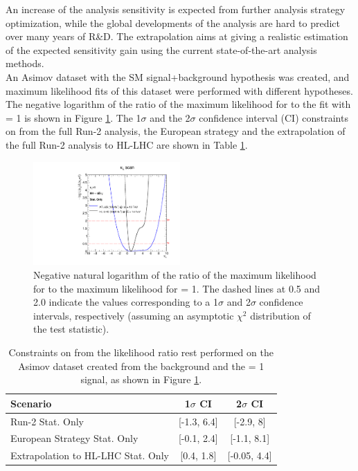 An increase of the analysis sensitivity is expected from further analysis strategy optimization, while the global developments of the analysis are hard to predict over many years of R\&D. The extrapolation aims at giving a realistic estimation of the expected sensitivity gain using the current state-of-the-art analysis methods. \\

An Asimov dataset with the SM signal+background hypothesis was created, and maximum likelihood fits of this dataset were performed with different \kl hypotheses. The negative logarithm of the ratio of the maximum likelihood for \kl to the fit with \kl= 1 is shown in Figure \ref{fig:HL-LHC:LH}. The 1$\sigma$ and the 2$\sigma$ confidence interval (CI) constraints on \kl from the full Run-2 analysis, the European strategy and the extrapolation of the full Run-2 analysis to HL-LHC are shown in Table \ref{tab:HL-LHC:kl}. 

\begin{figure}[htbp]
    \centering
    \includegraphics[width=0.5\textwidth]{Ch6/Img/likelihood_subplot_14TeV.pdf}
    \begin{tcolorbox}[colback=black!5!white, colframe=white!75!black]
    \caption{Negative natural logarithm of the ratio of the maximum likelihood for \kl to the maximum likelihood for \kl= 1. The dashed lines at 0.5 and 2.0 indicate the values corresponding to a 1$\sigma$ and 2$\sigma$ confidence intervals, respectively (assuming an asymptotic $\chi^2$ distribution of the test statistic).}
    \label{fig:HL-LHC:LH}
    \end{tcolorbox}
\end{figure}

\begin{table}[htbp]
    \centering
    \begin{tabular}{lcc}
    \hline\hline 
        Scenario & 1$\sigma$ CI & 2$\sigma$ CI \\
    \hline    
        Run-2 Stat. Only & [-1.3, 6.4]  & [-2.9, 8] \\ 
        European Strategy Stat. Only & [-0.1, 2.4] & [-1.1, 8.1] \\
        Extrapolation to HL-LHC Stat. Only & [0.4, 1.8] & [-0.05, 4.4] \\
    \hline\hline 
    \end{tabular}
    \begin{tcolorbox}[colback=black!5!white, colframe=white!75!black]
    \caption{Constraints on \kl from the likelihood ratio rest performed on the Asimov dataset created from the background and the \kl= 1 signal, as shown in Figure \ref{fig:HL-LHC:LH}.}
    \label{tab:HL-LHC:kl}
    \end{tcolorbox}
\end{table}

